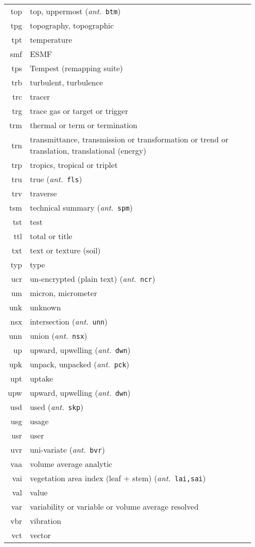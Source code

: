 \documentclass[12pt,twoside]{article}
\newcommand{\ant}[1]{(\textit{ant.}~\texttt{#1})}
\begin{document}
\begin{longtable}[>{\bfseries}l]{>{\ttfamily}r l}
top & top, uppermost \ant{btm} \\
tpg & topography, topographic \\
tpt & temperature \\
smf & ESMF \\
tps & Tempest (remapping suite) \\
trb & turbulent, turbulence \\
trc & tracer \\
trg & trace gas or target or trigger \\
trm & thermal or term or termination \\
trn & transmittance, transmission or transformation or trend or translation, translational (energy) \\
trp & tropics, tropical or triplet \\
tru & true \ant{fls} \\
trv & traverse \\
tsm & technical summary \ant{spm} \\
tst & test \\
ttl & total or title \\
txt & text or texture (soil) \\
typ & type \\
ucr & un-encrypted (plain text) \ant{ncr} \\
um & micron, micrometer \\
unk & unknown \\
nsx & intersection \ant{unn} \\
unn & union \ant{nsx} \\
up & upward, upwelling \ant{dwn} \\
upk & unpack, unpacked \ant{pck} \\
upt & uptake \\
upw & upward, upwelling \ant{dwn} \\
usd & used \ant{skp} \\
usg & usage \\
usr & user \\
uvr & uni-variate \ant{bvr} \\
vaa & volume average analytic \\
vai & vegetation area index (leaf + stem) \ant{lai,sai} \\
val & value \\
var & variability or variable or volume average resolved \\
vbr & vibration \\
vct & vector \\

\end{longtable}
\end{document}
